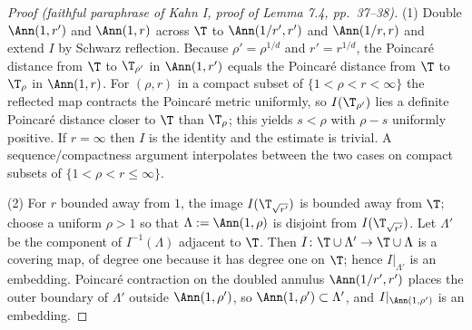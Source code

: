 \begin{proof}[Proof (faithful paraphrase of Kahn I, proof of Lemma 7.4, pp.~37--38)]
(1) Double \(\Ann(1,r')\) and \(\Ann(1,r)\) across \(\T\) to
\(\Ann(1/r',r')\) and \(\Ann(1/r,r)\) and extend \(I\) by Schwarz
reflection.  Because \(\rho'=\rho^{1/d}\) and \(r'=r^{1/d}\), the
Poincar\'e distance from \(\T\) to \(\T_{\rho'}\) in \(\Ann(1,r')\)
equals the Poincar\'e distance from \(\T\) to \(\T_{\rho}\) in
\(\Ann(1,r)\).  For \((\rho,r)\) in a compact subset of
\(\{1<\rho<r<\infty\}\) the reflected map contracts the Poincar\'e
metric uniformly, so \(I(\T_{\rho'})\) lies a definite Poincar\'e
distance closer to \(\T\) than \(\T_\rho\); this yields \(s<\rho\)
with \(\rho-s\) uniformly positive.  If \(r=\infty\) then \(I\) is the
identity and the estimate is trivial.  A sequence/compactness argument
interpolates between the two cases on compact subsets of
\(\{1<\rho<r\le\infty\}\).

(2) For \(r\) bounded away from \(1\), the image \(I(\T_{\sqrt{r'}})\)
is bounded away from \(\T\); choose a uniform \(\rho>1\) so that
\(\Lambda:=\Ann(1,\rho)\) is disjoint from \(I(\T_{\sqrt{r'}})\).  Let
\(\Lambda'\) be the component of \(I^{-1}(\Lambda)\) adjacent to
\(\T\).  Then \(I\colon\T\cup\Lambda'\to\T\cup\Lambda\) is a covering
map, of degree one because it has degree one on \(\T\); hence
\(I|_{\Lambda'}\) is an embedding.  Poincar\'e contraction on the
doubled annulus \(\Ann(1/r',r')\) places the outer boundary of
\(\Lambda'\) outside \(\Ann(1,\rho')\), so
\(\Ann(1,\rho')\subset\Lambda'\), and \(I|_{\Ann(1,\rho')}\) is an
embedding.
\end{proof}